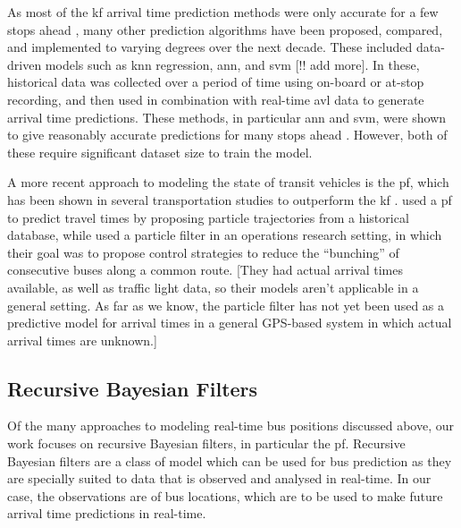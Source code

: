\documentclass[12pt,a4paper]{article}
\begin{document}
As most of the \gls{kf} arrival time prediction methods were only accurate for
a few stops ahead \citep{yu-etal:2006},
many other prediction algorithms have been proposed, compared, and implemented
to varying degrees over the next decade.
These included data-driven models such as \gls{knn} regression,
\gls{ann}, and \gls{svm} 
\citep{chang-etal:2010,jeong-rilett:2005,yu-etal:2006,yu-etal:2010,yu-etal:2011} [!! add more].
In these, historical data was collected over a period of time using on-board or at-stop recording,
and then used in combination with
real-time \gls{avl} data to generate arrival time predictions.
These methods, in particular \gls{ann} and \gls{svm},
were shown to give reasonably accurate predictions for many stops ahead 
\citep{cn}.
However, both of these require significant dataset size to train the model.


A more recent approach to modeling the state of transit vehicles is the \gls{pf},
which has been shown in several transportation studies to outperform the \gls{kf}
\citep{chen-rakha:2014,cn}.
\cite{chen-rakha:2014} used a \gls{pf} to predict travel times 
by proposing particle trajectories from a historical database,
while \cite{hans-etal:2015} used a particle filter in an operations research setting,
in which their goal was to propose control strategies to reduce the ``bunching''
of consecutive buses along a common route.
[They had actual arrival times available, as well as traffic light data,
so their models aren't applicable in a general setting.
As far as we know, the particle filter has not yet been used as a predictive model for arrival times
in a general GPS-based system in which actual arrival times are unknown.]




\subsection{Recursive Bayesian Filters}
\label{sec:recursive}


Of the many approaches to modeling real-time bus positions discussed above,
our work focuses on recursive Bayesian filters, in particular the \gls{pf}.
Recursive Bayesian filters are a class of model which can be used for bus prediction 
as they are specially suited to data that is observed and analysed in real-time.
In our case, the observations are of bus locations,
which are to be used to make future arrival time predictions in real-time.
\end{document}

